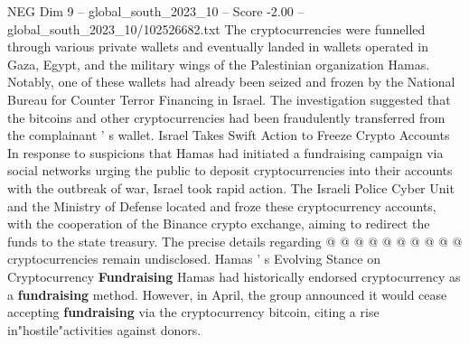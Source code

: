 \begin{textsample}{NEG Dim 9 – global\_south\_2023\_10 – Score -2.00 – global\_south\_2023\_10/102526682.txt}
The cryptocurrencies were funnelled through various private wallets and eventually landed in wallets operated in Gaza, Egypt, and the military wings of the Palestinian organization Hamas.
Notably, one of these wallets had already been seized and frozen by the National Bureau for Counter Terror Financing in Israel.
The investigation suggested that the bitcoins and other cryptocurrencies had been fraudulently transferred from the complainant ' s wallet.
Israel Takes Swift Action to Freeze Crypto Accounts In response to suspicions that Hamas had initiated a fundraising campaign via social networks urging the public to deposit cryptocurrencies into their accounts with the outbreak of war, Israel took rapid action.
The Israeli Police Cyber Unit and the Ministry of Defense located and froze these cryptocurrency accounts, with the cooperation of the Binance crypto exchange, aiming to redirect the funds to the state treasury.
The precise details regarding @ @ @ @ @ @ @ @ @ @ cryptocurrencies remain undisclosed.
Hamas ' s Evolving Stance on Cryptocurrency \textbf{Fundraising} Hamas had historically endorsed cryptocurrency as a \textbf{fundraising} method.
However, in April, the group announced it would cease accepting \textbf{fundraising} via the cryptocurrency bitcoin, citing a rise in"hostile"activities against donors.

\end{textsample}
